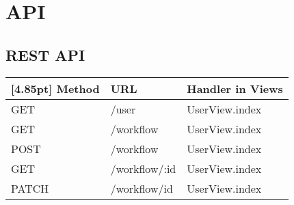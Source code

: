 \chapter{API}
    \section{REST API}
    
    \begin{center}
	    \setlength\tabcolsep{5pt}
    	\renewcommand{\arraystretch}{1.5}
        	\begin{tabularx}{\textwidth}{|l|l|X|}
        	\hline
        	\rowcolor[gray]{0.75}[4.85pt]
    		Method & URL & Handler in Views \\ \hline 
            GET & /user & UserView.index \\ \hline
            GET & /workflow & UserView.index \\ \hline
            POST & /workflow & UserView.index \\ \hline
            GET & /workflow/:id & UserView.index \\ \hline
            PATCH & /workflow/id & UserView.index \\ \hline
        	\end{tabularx}
	\end{center}
